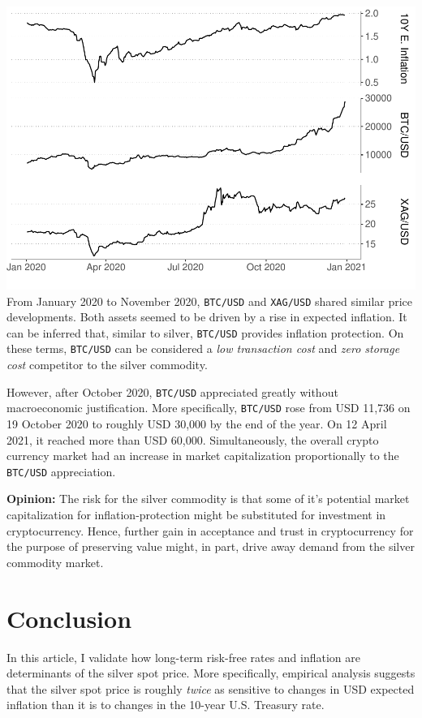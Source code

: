 \documentclass[
  12pt,
]{article}
\begin{document}
\includegraphics{silver-market-timing_files/figure-latex/bitcoin-1.pdf}
From January 2020 to November 2020, \texttt{BTC/USD} and
\texttt{XAG/USD} shared similar price developments. Both assets seemed
to be driven by a rise in expected inflation. It can be inferred that,
similar to silver, \texttt{BTC/USD} provides inflation protection. On
these terms, \texttt{BTC/USD} can be considered a \emph{low transaction
cost} and \emph{zero storage cost} competitor to the silver commodity.

However, after October 2020, \texttt{BTC/USD} appreciated greatly
without macroeconomic justification. More specifically, \texttt{BTC/USD}
rose from USD 11,736 on 19 October 2020 to roughly USD 30,000 by the end
of the year. On 12 April 2021, it reached more than USD 60,000.
Simultaneously, the overall crypto currency market had an increase in
market capitalization proportionally to the \texttt{BTC/USD}
appreciation.

\textbf{Opinion:} The risk for the silver commodity is that some of it's
potential market capitalization for inflation-protection might be
substituted for investment in cryptocurrency. Hence, further gain in
acceptance and trust in cryptocurrency for the purpose of preserving
value might, in part, drive away demand from the silver commodity
market.

\hypertarget{conclusion}{%
\section{Conclusion}\label{conclusion}}

In this article, I validate how long-term risk-free rates and inflation
are determinants of the silver spot price. More specifically, empirical
analysis suggests that the silver spot price is roughly \emph{twice} as
sensitive to changes in USD expected inflation than it is to changes in
the 10-year U.S. Treasury rate.
\end{document}
